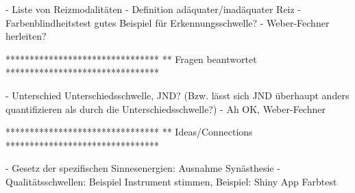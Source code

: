 - Liste von Reizmodalitäten
- Definition adäquater/inadäquater Reiz
- Farbenblindheitstest gutes Beispiel für Erkennungsschwelle?
- Weber-Fechner herleiten?


********************************
** Fragen beantwortet
********************************

- Unterschied Unterschiedsschwelle, JND? (Bzw. lässt sich JND überhaupt anders quantifizieren als durch die Unterschiedsschwelle?) - Ah OK, Weber-Fechner 


********************************
** Ideas/Connections
********************************

- Gesetz der spezifischen Sinnesenergien: Ausnahme Synästhesie
- Qualitätsschwellen: Beispiel Instrument stimmen, Beispiel: Shiny App Farbtest
